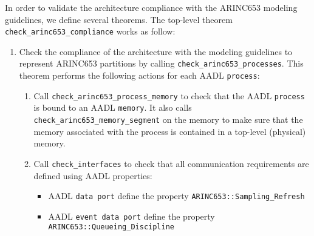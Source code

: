 \documentclass[times, 10pt]{article}
\begin{document}
In order to validate the architecture compliance with the ARINC653 modeling
guidelines, we define several theorems. The top-level theorem
\texttt{check\_arinc653\_compliance} works as follow:
\begin{enumerate}
    \item
        Check the compliance of the architecture with
        the modeling guidelines to represent ARINC653 partitions
        by calling \texttt{check\_arinc653\_processes}. This theorem
        performs the following actions for each AADL \texttt{process}:
        \begin{enumerate}
            \item
                Call \texttt{check\_arinc653\_process\_memory} to check
                that the AADL \texttt{process} is bound to an AADL
                \texttt{memory}. It also calls
                \texttt{check\_arinc653\_memory\_segment} on the memory to make
                sure that the memory associated with the process is contained
                in a top-level (physical) memory.

            \item
                Call \texttt{check\_interfaces} to check that all communication
                requirements are defined using AADL properties:
                \begin{itemize}
                    \item
                        AADL \texttt{data port} define the property
                        \texttt{ARINC653::Sampling\_Refresh}
                    \item
                        AADL \texttt{event data port} define the property
                        \texttt{ARINC653::Queueing\_Discipline}
                \end{itemize}


\end{enumerate}
\end{enumerate}
\end{document}
